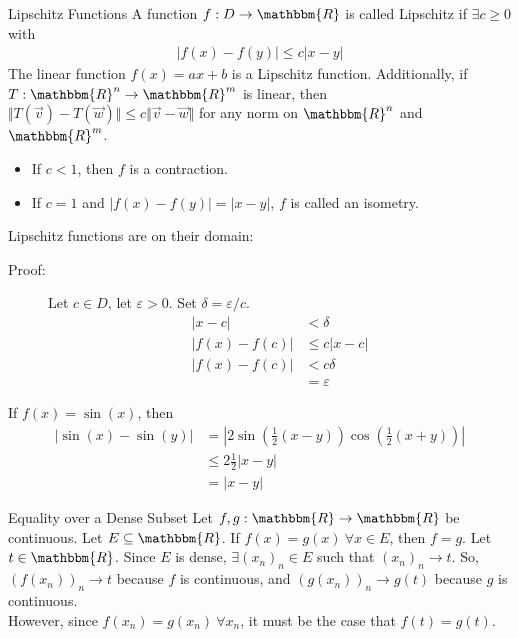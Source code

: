 \documentclass[10pt]{extarticle}
\newcommand{\R}{\mathbbm{R}}
\begin{document}
  \begin{problem}{Lipschitz Functions}
    A function $f: D\rightarrow \R$ is called Lipschitz if $\exists c \geq 0$ with 
    \begin{align*}
      |f(x) - f(y)| \leq c|x-y| \tag*{$\forall x,y\in D$}
    \end{align*}
    The linear function $f(x) = ax + b$ is a Lipschitz function. Additionally, if $T: \R^n \rightarrow \R^m$ is linear, then $\Vert T(\vec{v}) - T(\vec{w})\Vert \leq c\Vert \vec{v}-\vec{w}\Vert$ for any norm on $\R^n$ and $\R^m$.
    \begin{itemize}
      \item If $c < 1$, then $f$ is a contraction.
      \item If $c = 1$ and $|f(x) - f(y)| = |x-y|$, $f$ is called an isometry.
    \end{itemize}
    Lipschitz functions are on their domain:
    \begin{description}
      \item[Proof:] Let $c\in D$, let $\varepsilon > 0$. Set $\delta = \varepsilon/c$.
        \begin{align*}
          |x-c| &< \delta\\
          |f(x) - f(c)| &\leq c|x-c|\\
          |f(x) - f(c)| &< c\delta\\
                        &= \varepsilon
        \end{align*}
    \end{description}
    If $f(x) = \sin(x)$, then
    \begin{align*}
      |\sin(x) - \sin(y)| &= \left|2\sin\left(\frac{1}{2}(x-y)\right)\cos\left(\frac{1}{2}(x+y)\right)\right|\\
                          &\leq 2\frac{1}{2}|x-y|\\
                          &= |x-y|
    \end{align*}
  \end{problem}
  \begin{problem}{Equality over a Dense Subset}
    Let $f,g: \R\rightarrow\R$ be continuous. Let $E\subseteq \R$. If $f(x) = g(x)~\forall x\in E$, then $f = g$.
    \tcblower
    Let $t\in\R$. Since $E$ is dense, $\exists (x_n)_n \in E$ such that $(x_n)_n \rightarrow t$. So, $(f(x_n))_n \rightarrow t$ because $f$ is continuous, and $(g(x_n))_n \rightarrow g(t)$ because $g$ is continuous.\\

    However, since $f(x_n) = g(x_n)~\forall x_n$, it must be the case that $f(t) = g(t)$.
  \end{problem}
\end{document}
